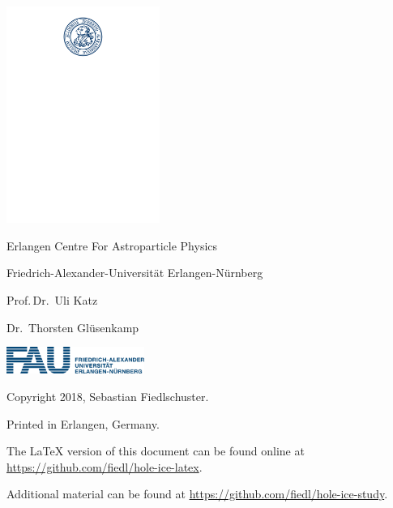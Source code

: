 
\makeatletter
\begin{titlepage}
  \begin{center}

    \LARGE \@title

    \vspace{1cm}

    \large

    \@author \medskip

    \@date

    \vspace{1cm}
    \includegraphics[width=5cm, decodearray={0.2 0.5}]{img/fau-siegel-blau}
    \vspace{1cm}

    Erlangen Centre For Astroparticle Physics \medskip

    Friedrich-Alexander-Universität Erlangen-Nürnberg \medskip

    Prof.\,Dr.~Uli Katz \medskip

    Dr.~Thorsten Glüsenkamp

    \vfill
    \includegraphics[width=4.5cm]{img/FAU-Logo-Transparent-PNG-RGB}\hfill
    \hfill


  \end{center}
\end{titlepage}
\makeatother


\newpage
\thispagestyle{empty}
\mbox{}\vfill
Copyright 2018, Sebastian Fiedlschuster.

Printed in Erlangen, Germany.

The \LaTeX\xspace version of this document can be found online at \url{https://github.com/fiedl/hole-ice-latex}.

Additional material can be found at \url{https://github.com/fiedl/hole-ice-study}.

